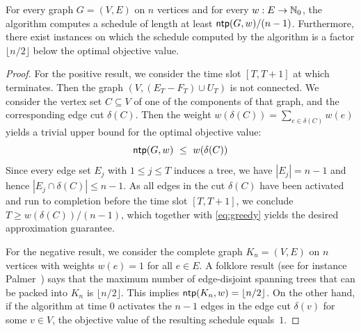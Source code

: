 \begin{theorem}
\label{th:greedy.approx}
For every graph $G=(V,E)$ on $n$ vertices and for every $w:E\to\mathbb{N}_0$, 
the {\greedy} algorithm computes a schedule of length at least $\operatorname{\textsf{ntp}}(G,w)/(n-1)$.
Furthermore, there exist instances on which the schedule computed by the 
{\greedy} algorithm is a factor $\lfloor n/2\rfloor$ below the optimal objective value.
\end{theorem}
\begin{proof}
For the positive result, we consider the time slot $[T,T+1]$ at which {\greedy} terminates.
Then the graph $(V,(E_T-F_T)\cup U_T)$ is not connected.
We consider the vertex set $C\subseteq V$ of one of the components of that graph, and the
corresponding edge cut $\delta(C)$.
Then the weight $w(\delta(C))=\sum_{e\in\delta(C)}w(e)$ yields a trivial upper bound for the 
optimal objective value: 
\begin{equation}
\label{eq:greedy}
\operatorname{\textsf{ntp}}(G,w) ~\le~ w(\delta(C))
\end{equation}
Since every edge set $E_j$ with $1\le j\le T$ induces a tree, we have $|E_j|=n-1$ and hence
$|E_j\cap \delta(C)|\le n-1$.
As all edges in the cut $\delta(C)$ have been activated and run to completion before the 
time slot $[T,T+1]$, we conclude $T\ge w(\delta(C))/(n-1)$, which together with \eqref{eq:greedy}
yields the desired approximation guarantee.

For the negative result, we consider the complete graph $K_n=(V,E)$ on $n$ vertices with 
weights $w(e)=1$ for all $e\in E$.
A folklore result (see for instance Palmer~\cite{Palmer2001}) says that the maximum number of 
edge-disjoint spanning trees that can be packed into $K_n$ is $\lfloor n/2\rfloor$.
This implies $\operatorname{\textsf{ntp}}(K_n,w)=\lfloor n/2\rfloor$.
On the other hand, if the {\greedy} algorithm at time $0$ activates the $n-1$ edges in the edge
cut $\delta(v)$ for some $v\in V$, the objective value of the resulting schedule equals~$1$.
\end{proof}


